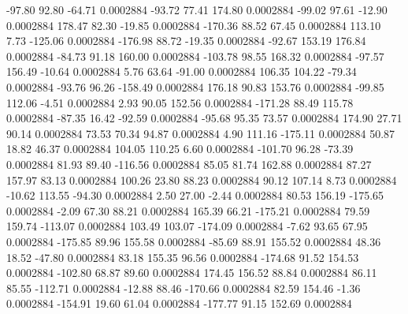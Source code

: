       -97.80       92.80      -64.71     0.0002884
      -93.72       77.41      174.80     0.0002884
      -99.02       97.61      -12.90     0.0002884
      178.47       82.30      -19.85     0.0002884
     -170.36       88.52       67.45     0.0002884
      113.10        7.73     -125.06     0.0002884
     -176.98       88.72      -19.35     0.0002884
      -92.67      153.19      176.84     0.0002884
      -84.73       91.18      160.00     0.0002884
     -103.78       98.55      168.32     0.0002884
      -97.57      156.49      -10.64     0.0002884
        5.76       63.64      -91.00     0.0002884
      106.35      104.22      -79.34     0.0002884
      -93.76       96.26     -158.49     0.0002884
      176.18       90.83      153.76     0.0002884
      -99.85      112.06       -4.51     0.0002884
        2.93       90.05      152.56     0.0002884
     -171.28       88.49      115.78     0.0002884
      -87.35       16.42      -92.59     0.0002884
      -95.68       95.35       73.57     0.0002884
      174.90       27.71       90.14     0.0002884
       73.53       70.34       94.87     0.0002884
        4.90      111.16     -175.11     0.0002884
       50.87       18.82       46.37     0.0002884
      104.05      110.25        6.60     0.0002884
     -101.70       96.28      -73.39     0.0002884
       81.93       89.40     -116.56     0.0002884
       85.05       81.74      162.88     0.0002884
       87.27      157.97       83.13     0.0002884
      100.26       23.80       88.23     0.0002884
       90.12      107.14        8.73     0.0002884
      -10.62      113.55      -94.30     0.0002884
        2.50       27.00       -2.44     0.0002884
       80.53      156.19     -175.65     0.0002884
       -2.09       67.30       88.21     0.0002884
      165.39       66.21     -175.21     0.0002884
       79.59      159.74     -113.07     0.0002884
      103.49      103.07     -174.09     0.0002884
       -7.62       93.65       67.95     0.0002884
     -175.85       89.96      155.58     0.0002884
      -85.69       88.91      155.52     0.0002884
       48.36       18.52      -47.80     0.0002884
       83.18      155.35       96.56     0.0002884
     -174.68       91.52      154.53     0.0002884
     -102.80       68.87       89.60     0.0002884
      174.45      156.52       88.84     0.0002884
       86.11       85.55     -112.71     0.0002884
      -12.88       88.46     -170.66     0.0002884
       82.59      154.46       -1.36     0.0002884
     -154.91       19.60       61.04     0.0002884
     -177.77       91.15      152.69     0.0002884
